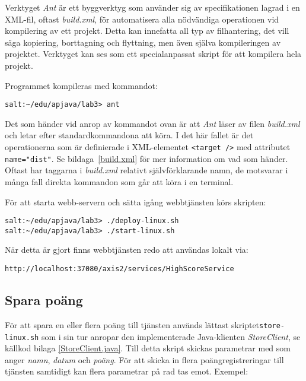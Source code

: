 \documentclass[a4paper, 12pt]{article}
\begin{document}
Verktyget \textit{Ant} är ett byggverktyg som använder sig av
specifikationen lagrad i en XML-fil, oftast \textit{build.xml}, för
automatisera alla nödvändiga operationen vid kompilering av ett
projekt. Detta kan innefatta all typ av filhantering, det vill säga
kopiering, borttagning och flyttning, men även själva kompileringen av
projektet. Verktyget kan ses som ett specialanpassat skript för att
kompilera hela projekt.

Programmet kompileras med kommandot:\\
\begin{footnotesize}
\verb!salt:~/edu/apjava/lab3> ant!
\end{footnotesize}

Det som händer vid anrop av kommandot ovan är att \textit{Ant} läser
av filen \textit{build.xml} och letar efter standardkommandona att
köra. I det här fallet är det operationerna som är definierade i
XML-elementet \verb!<target />! med attributet \verb!name="dist"!. Se
bildaga~\ref{build.xml} för mer information om vad som händer. Oftast
har taggarna i \textit{build.xml} relativt självförklarande namn, de
motsvarar i många fall direkta kommandon som går att köra i en
terminal.

För att starta webb-servern och sätta igång webbtjänsten körs skripten:\\
\begin{footnotesize}
\verb!salt:~/edu/apjava/lab3> ./deploy-linux.sh !\\
\verb!salt:~/edu/apjava/lab3> ./start-linux.sh !
\end{footnotesize}

När detta är gjort finns webbtjänsten redo att användas lokalt via:\\
\begin{footnotesize}
\verb!http://localhost:37080/axis2/services/HighScoreService!
\end{footnotesize}

\subsection{Spara poäng}

För att spara en eller flera poäng till tjänsten används lättast
skriptet\linebreak \texttt{store-linux.sh} som i sin tur anropar den
implementerade Java-klienten \textit{StoreClient}, se källkod bilaga
\ref{StoreClient.java}. Till detta skript skickas parametrar med som
anger \textit{namn}, \textit{datum} och \textit{poäng}. För att skicka
in flera poäng\-registreringar till tjänsten samtidigt kan flera
parametrar på rad tas emot. Exempel:
\end{document}
